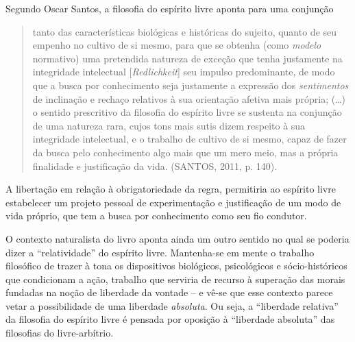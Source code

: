 \documentclass[
	12pt,				%
	openright,			%
	oneside,			%
	a4paper,			%
	english,			%
	french,				%
	spanish,			%
	brazil				%
	]{abntex2}
\begin{document}
Segundo Oscar Santos, a filosofia do espírito livre aponta para uma conjunção 

\begin{quotation}
tanto das características biológicas e históricas do sujeito, quanto de seu empenho no cultivo de si mesmo, para que se obtenha (como \textit{modelo} normativo) uma pretendida natureza de exceção que tenha justamente na integridade intelectual [\textit{Redlichkeit}] seu impulso predominante, de modo que a busca por conhecimento seja justamente a expressão dos \textit{sentimentos} de inclinação e rechaço relativos à sua orientação afetiva mais própria; (…) o sentido prescritivo da filosofia do espírito livre se sustenta na conjunção de uma natureza rara, cujos tons mais sutis dizem respeito à sua integridade intelectual, e o trabalho de cultivo de si mesmo, capaz de fazer da busca pelo conhecimento algo mais que um mero meio, mas a própria finalidade e justificação da vida. (SANTOS, 2011, p. 140).
\end{quotation}

A libertação em relação à obrigatoriedade da regra, permitiria ao espírito livre estabelecer um projeto pessoal de experimentação e justificação de um modo de vida próprio, que tem a busca por conhecimento como seu fio condutor.

	O contexto naturalista do livro aponta ainda um outro sentido no qual se poderia dizer a “relatividade” do espírito livre. Mantenha-se em mente o trabalho filosófico de trazer à tona os dispositivos biológicos, psicológicos e sócio-históricos que condicionam a ação, trabalho que serviria de recurso à superação das morais fundadas na noção de liberdade da vontade – e vê-se que esse contexto parece vetar a possibilidade de uma liberdade \textit{absoluta}. Ou seja, a “liberdade relativa” da filosofia do espírito livre é pensada por oposição à “liberdade absoluta” das filosofias do livre-arbítrio.
	
\end{document}
